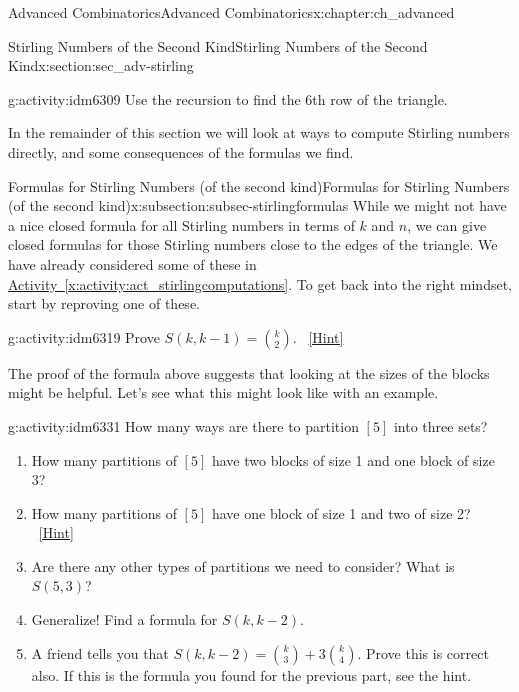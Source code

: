 \documentclass[oneside,10pt,]{book}
\numberwithin{equation}{chapter}
\begin{document}
\begin{chapterptx}{Advanced Combinatorics}{}{Advanced Combinatorics}{}{}{x:chapter:ch_advanced}
\begin{sectionptx}{Stirling Numbers of the Second Kind}{}{Stirling Numbers of the Second Kind}{}{}{x:section:sec_adv-stirling}
\begin{introduction}{}
\begin{sidebyside}{1}{0.25}{0.25}{0}
\end{sidebyside}%
\begin{activity}{}{g:activity:idm6309}%
Use the recursion to find the 6th row of the triangle.%
\end{activity}
In the remainder of this section we will look at ways to compute Stirling numbers directly, and some consequences of the formulas we find.%
\end{introduction}%
%
%
\typeout{************************************************}
\typeout{************************************************}
%
\begin{subsectionptx}{Formulas for Stirling Numbers (of the second kind)}{}{Formulas for Stirling Numbers (of the second kind)}{}{}{x:subsection:subsec-stirlingformulas}
While we might not have a nice closed formula for all Stirling numbers in terms of \(k\) and \(n\), we can give closed formulas for those Stirling numbers close to the edges of the triangle.  We have already considered some of these in \hyperref[x:activity:act_stirlingcomputations]{Activity~\ref{x:activity:act_stirlingcomputations}}.  To get back into the right mindset, start by reproving one of these.%
\begin{activity}{}{g:activity:idm6319}%
Prove \(S(k, k-1) = \binom{k}{2}\).%
\qquad~\hfill{\tiny\hyperlink{g:hint:idm6323-back}{[Hint]}}\end{activity}
The proof of the formula above suggests that looking at the sizes of the blocks might be helpful.  Let's see what this might look like with an example.%
\begin{activity}{}{g:activity:idm6331}%
How many ways are there to partition \([5]\) into three sets?%
\begin{enumerate}[font=\bfseries,label=(\alph*),ref=\alph*]
\item{}How many partitions of \([5]\) have two blocks of size 1 and one block of size 3?%
\item{}How many partitions of \([5]\) have one block of size 1 and two of size 2?%
\qquad~\hfill{\tiny\hyperlink{g:hint:idm6346-back}{[Hint]}}\item{}Are there any other types of partitions we need to consider?  What is \(S(5,3)\)?%
\item{}Generalize! Find a formula for \(S(k, k-2)\).%
\item{}A friend tells you that \(S(k,k-2) = \binom{k}{3} + 3 \binom{k}{4}\).  Prove this is correct also.  If this is the formula you found for the previous part, see the hint.%

\end{enumerate}
\end{activity}
\end{subsectionptx}
\end{sectionptx}
\end{chapterptx}
\end{document}
